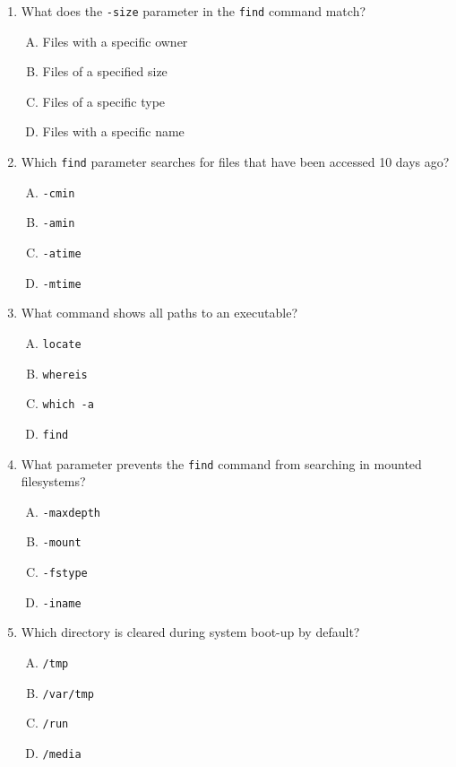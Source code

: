\documentclass[a4paper]{report}
\begin{document}
\begin{enumerate}[1.]
    \item What does the \texttt{-size} parameter in the \texttt{find} command match?  
    \begin{enumerate}[A)]
        \item Files with a specific owner  
        \item Files of a specified size  
        \item Files of a specific type  
        \item Files with a specific name  
    \end{enumerate}

    \item Which \texttt{find} parameter searches for files that have been accessed 10 days ago?  
    \begin{enumerate}[A)]
        \item \texttt{-cmin}  
        \item \texttt{-amin}  
        \item \texttt{-atime}  
        \item \texttt{-mtime}  
    \end{enumerate}

    \item What command shows all paths to an executable?  
    \begin{enumerate}[A)]
        \item \texttt{locate}  
        \item \texttt{whereis}  
        \item \texttt{which -a}  
        \item \texttt{find}  
    \end{enumerate}

    \item What parameter prevents the \texttt{find} command from searching in mounted filesystems?  
    \begin{enumerate}[A)]
        \item \texttt{-maxdepth}  
        \item \texttt{-mount}  
        \item \texttt{-fstype}  
        \item \texttt{-iname}  
    \end{enumerate}

    \item Which directory is cleared during system boot-up by default?  
    \begin{enumerate}[A)]
        \item \texttt{/tmp}  
        \item \texttt{/var/tmp}  
        \item \texttt{/run}  
        \item \texttt{/media}  
    \end{enumerate}

\end{enumerate}
\end{document}
